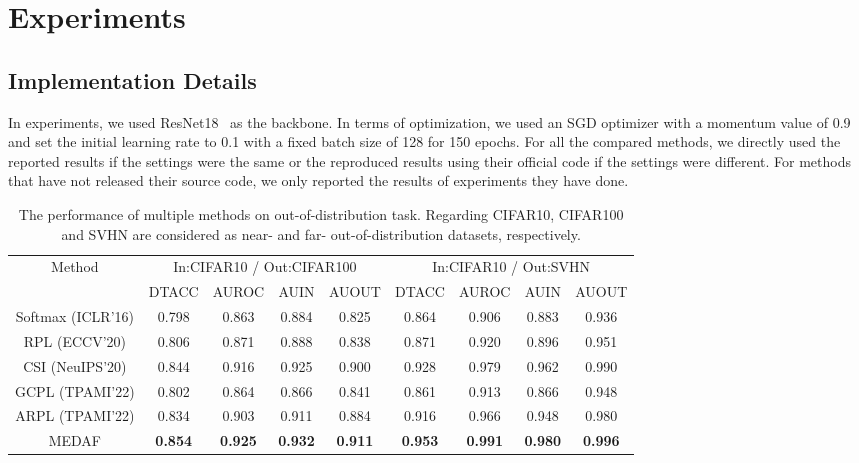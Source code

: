 \documentclass[letterpaper]{article} %
\begin{document}
\section{Experiments}
\subsection{Implementation Details}
In experiments, we used ResNet18~\cite{he2016deep} as the backbone. In terms of optimization, we used an SGD optimizer with a momentum value of 0.9 and set the initial learning rate to 0.1 with a fixed batch size of 128 for 150 epochs. For all the compared methods, we directly used the reported results if the settings were the same or the reproduced results using their official code if the settings were different. For methods that have not released their source code, we only reported the results of experiments they have done.
\begin{table}[t]
\centering
\small
\begin{tabular}{ccccccccc}
    \hline
    \multirow{2}[4]{*}{Method}&\multicolumn{4}{c}{In:CIFAR10 / Out:CIFAR100} & \multicolumn{4}{c}{In:CIFAR10 / Out:SVHN} \\
    \cline{2-5} \cline{6-9}
    & DTACC & AUROC & AUIN  & AUOUT & DTACC & AUROC & AUIN  & AUOUT \\ \hline
    Softmax (ICLR'16)& 0.798 & 0.863 & 0.884 & 0.825 & 0.864 & 0.906 & 0.883 & 0.936 \\
    RPL (ECCV'20)& 0.806 & 0.871 & 0.888 & 0.838 & 0.871 & 0.920 & 0.896 & 0.951 \\
    CSI (NeuIPS'20)& 0.844 & 0.916 & 0.925 & 0.900 & 0.928 & 0.979 & 0.962 & 0.990 \\
    GCPL (TPAMI'22)& 0.802 & 0.864 & 0.866 & 0.841 & 0.861 & 0.913 & 0.866 & 0.948 \\
    ARPL (TPAMI'22)& 0.834 & 0.903 & 0.911 & 0.884 & 0.916 & 0.966 & 0.948 & 0.980 \\ \hline
    MEDAF & \textbf{0.854} & \textbf{0.925} & \textbf{0.932} & \textbf{0.911} & \textbf{0.953} & \textbf{0.991} & \textbf{0.980} & \textbf{0.996} \\ \hline
\end{tabular}
\caption{The performance of multiple methods on out-of-distribution task. Regarding CIFAR10, CIFAR100 and SVHN are considered as near- and far- out-of-distribution datasets, respectively.}
\label{table_ood}
\end{table}
\end{document}
